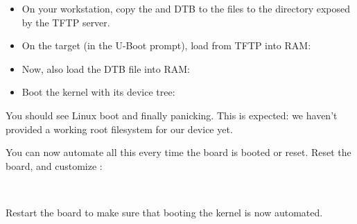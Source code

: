 \begin{itemize}

\item On your workstation, copy the  and DTB to the
files to the directory exposed by the TFTP server.

\item On the target (in the U-Boot prompt), load  from
TFTP into RAM:
{}
{}

\item Now, also load the DTB file into RAM:\\
{}
{}

\item Boot the kernel with its device tree:\\
{}
{}

\end{itemize}

You should see Linux boot and finally panicking. This is expected: we
haven't provided a working root filesystem for our device yet.

You can now automate all this every time the board is booted or
reset. Reset the board, and customize :

{\scriptsize
{}\\
}

Restart the board to make sure that booting the kernel is now automated.

